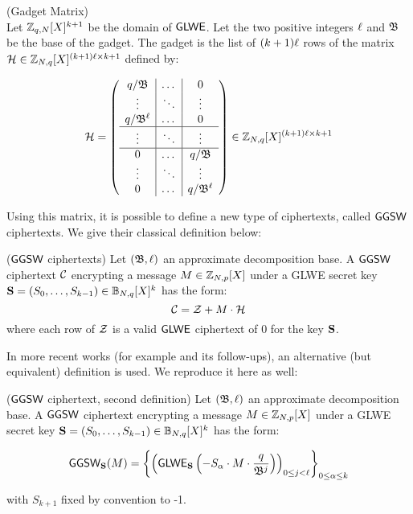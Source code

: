 	
\begin{definition}(Gadget Matrix)\\
	Let $\mathbb{Z}_{q, N}[X]^{k+1}$ be the domain of $\textsf{GLWE}$. Let the two positive integers $\ell$ and $\mathfrak{B}$ be the base of the gadget. The gadget is the list of $(k+1) \ell$ rows of the matrix $\mathcal H \in \mathbb{Z}_{N, q}[X]^{(k+1)\ell \times k+1}$ defined by:
	
	\[
	\mathcal H = 
	\left(
	\begin{array}{c|c|c}
		q / \mathfrak{B} & \dots & 0 \\
		\vdots & \ddots & \vdots  \\
		q / \mathfrak{B}^{\ell} & \dots & 0 \\
		\hline
		\vdots & \ddots & \vdots \\
		\hline
		0 & \dots & q / \mathfrak{B} \\
		\vdots & \ddots & \vdots  \\
		0 & \dots & q / \mathfrak{B}^{\ell}\\
	\end{array}
	\right) \in \mathbb{Z}_{N, q}[X]^{(k+1)\ell \times k+1}
	\]
\end{definition}
	


Using this matrix, it is possible to define a new type of ciphertexts, called $\textsf{GGSW}$ ciphertexts. We give their classical definition below:


\begin{definition}($\textsf{GGSW}$ ciphertexts)
	\label{def:ggsw}
	Let $(\mathfrak{B}, \ell)$ an approximate decomposition base. A $\textsf{GGSW}$ ciphertext $\mathcal C$ encrypting a message $M \in \mathbb{Z}_{N,p}[X]$ under a GLWE secret key $\mathbf S =  (S_0, \dots, S_{k-1}) \in \mathbb{B}_{N, q}[X]^k$ has the form:
	\begin{equation*}
		\mathcal C = \mathcal Z + M \cdot \mathcal H
	\end{equation*}
	where each row of $\mathcal Z$ is a valid $\textsf{GLWE}$ ciphertext of 0 for the key $\mathbf S$. 
	
\end{definition}


In more recent works (for example \cite{AC:CLOT21} and its follow-ups), an alternative (but equivalent) definition is used. We reproduce it here as well:

\begin{definition}($\textsf{GGSW}$ ciphertext, second definition)
	\label{def:ggsw2}
	Let $(\mathfrak{B}, \ell)$ an approximate decomposition base. A $\textsf{GGSW}$ ciphertext encrypting a message $M \in \mathbb{Z}_{N,p}[X]$ under a GLWE secret key $\mathbf S =  (S_0, \dots, S_{k-1}) \in \mathbb{B}_{N, q}[X]^k$ has the form:
	
	\begin{equation*}
		\textsf{GGSW}_{\mathbf S}(M) = \left \lbrace \left ( \textsf{GLWE}_{\mathbf S}\left (-S_\alpha \cdot M \cdot \frac{q}{\mathfrak{B}^j} \right) \right )_{0 \le j < \ell} \right \rbrace_{0\le \alpha \le k}
	\end{equation*}
	
	with $S_{k+1}$ fixed by convention to -1.
\end{definition}


